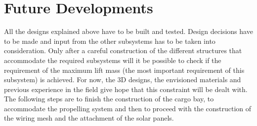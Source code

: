 \section{Future Developments}

All the designs explained above have to be built and tested. Design decisions have to be made and input from the other subsystems has to be taken into consideration. Only after a careful construction of the different structures that accommodate the required subsystems will it be possible to check if the requirement of the maximum lift mass (the most important requirement of this subsystem) is achieved. For now, the 3D designs, the envisioned materials and previous experience in the field give hope that this constraint will be dealt with. The following steps are to finish the construction of the cargo bay, to accommodate the propelling system and then to proceed with the construction of the wiring mesh and the attachment of the solar panels.

%
%
%
%
%
%
%
%
%
%
%
